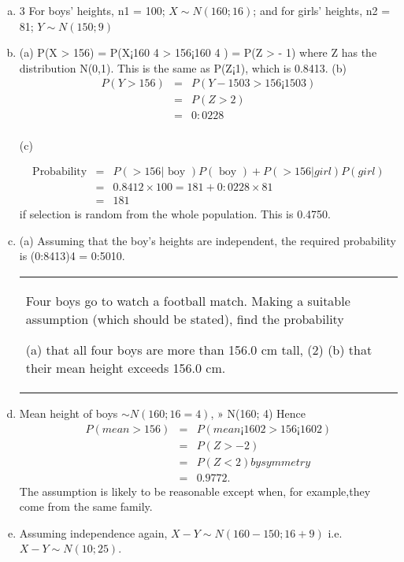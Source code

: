 \documentclass[a4paper,12pt]{article}
\begin{document}
\begin{enumerate}[(a)]
 \item 3 For boys’ heights, n1 = 100; $X \sim N(160; 16)$; and for girls’ heights, n2 = 81; $Y \sim N(150; 9)$
\item (a) P(X > 156) = P(X¡160
4 > 156¡160
4 ) = P(Z > - 1) where Z has the distribution
N(0,1). This is the same as P(Z¡1), which is 0.8413.
(b) 
\begin{eqnarray*}
  P(Y > 156) &=& P(Y - 150
3 > 156¡150
3 ) \\ &=& P(Z > 2)\\ &=& 0:0228  \\
\end{eqnarray*}

(c)

\begin{eqnarray*}
\mbox{Probability} &=&P(> 156|\mbox{ boy })P(\mbox{ boy }) + P(> 156|girl)P(girl)\\ &=& 0.8412 \times 100=181 +
0:0228 \times 81 \\&=&181
\end{eqnarray*} if selection is random from the whole population. This is 0.4750.
\item (a) Assuming that the boy’s heights are independent, the required probability is (0:8413)4
= 0:5010.

  \begin{table}[ht!]
  \centering
  \begin{tabular}{|p{15cm}|}
  \hline
Four boys go to watch a football match.  Making a suitable assumption (which should be stated), find the probability 
 
  (a) that all four boys are more than 156.0 cm tall,   (2)   (b) that their mean height exceeds 156.0 cm.    
  \hline
    \end{tabular}
 \end{table}
\item Mean height of boys $\sim N(160; 16=4)$, » N(160; 4)
Hence 
\begin{eqnarray*}
P(mean > 156) &=& P(mean¡160
2 > 156¡160
2 ) \\ &=& P(Z > - 2) \\ &=& P(Z < 2) by
symmetry\\ &=& 0.9772.
\end{eqnarray*}
The assumption is likely to be reasonable except when, for example,they come from
the same family.
\item Assuming independence again, $X -  Y \sim N(160 -  150; 16 + 9)$ i.e. $X -  Y \sim  N(10; 25)$.


\end{enumerate}
\end{document}

